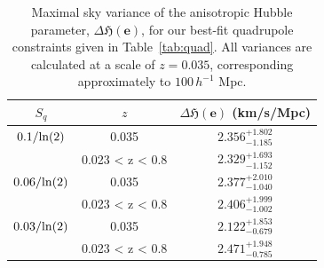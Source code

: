 \documentclass[fleqn,usenatbib]{mnras}
\newcommand{\jess}[1]{\textcolor{magenta} {\textbf{[JAC]:{#1}}}}
\begin{document}

 
\begin{table}
    \centering
    \begin{tabular}{c|c|c}
    \hline\hline
    $S_q$ & $z$ &  $\Delta \mathfrak{H}(\boldsymbol{e})$ (km/s/Mpc) \\ \hline\hline
     $ 0.1/{\rm ln}(2)$ & 0.035 &  $2.356^{+1.802}_{-1.185}$ \vspace{2mm} \\   
      & 0.023 < z < 0.8 & $2.329^{+1.693}_{-1.152}$ \\ \hline
     $0.06/{\rm ln}(2)$ & 0.035 & $2.377^{+2.010}_{-1.040} $ \vspace{2mm} \\
      & 0.023 < z < 0.8 & $2.406^{+1.999}_{-1.002}$ \\ \hline     
     $ 0.03/{\rm ln}(2)$ & 0.035 &  $2.122^{+1.853}_{-0.679}$ 
     \vspace{2mm} \\
           & 0.023 < z < 0.8 &  $2.471^{+1.948}_{-0.785}$ \\ 
    \hline\hline
    \end{tabular}
    \caption{Maximal sky variance of the anisotropic Hubble parameter, $\Delta \mathfrak{H}(\boldsymbol{e})$, for our best-fit quadrupole constraints given in Table~\ref{tab:quad}. All variances are calculated at a scale of $z=0.035$, corresponding approximately to $100\,h^{-1}$ Mpc. 
    }
    \label{tab:DeltaH0}
\end{table}




\end{document}
